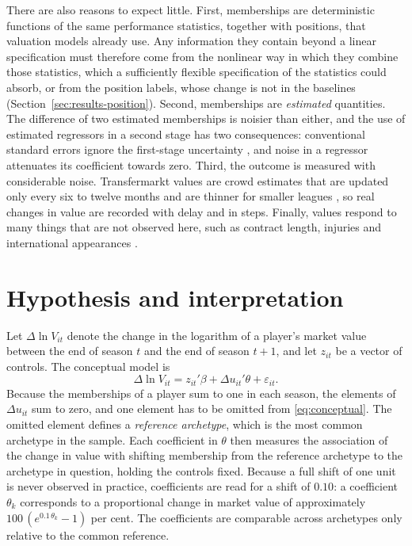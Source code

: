 There are also reasons to expect little. First, memberships are deterministic functions of the same performance statistics, together with positions, that valuation models already use. Any information they contain beyond a linear specification must therefore come from the nonlinear way in which they combine those statistics, which a sufficiently flexible specification of the statistics could absorb, or from the position labels, whose change is not in the baselines (Section~\ref{sec:results-position}). Second, memberships are \emph{estimated} quantities. The difference of two estimated memberships is noisier than either, and the use of estimated regressors in a second stage has two consequences: conventional standard errors ignore the first-stage uncertainty \cite{pagan1984econometric}, and noise in a regressor attenuates its coefficient towards zero. Third, the outcome is measured with considerable noise. Transfermarkt values are crowd estimates that are updated only every six to twelve months and are thinner for smaller leagues \cite{muller2017beyond}, so real changes in value are recorded with delay and in steps. Finally, values respond to many things that are not observed here, such as contract length, injuries and international appearances \cite{franceschi2024determinants,poli2024statistical}.

\section{Hypothesis and interpretation}
\label{sec:theory-hypothesis}

Let $\Delta\ln V_{it}$ denote the change in the logarithm of a player's market value between the end of season $t$ and the end of season $t+1$, and let $z_{it}$ be a vector of controls. The conceptual model is
\begin{equation}
	\Delta\ln V_{it} = z_{it}'\beta + \Delta u_{it}'\theta + \varepsilon_{it}.
	\label{eq:conceptual}
\end{equation}
Because the memberships of a player sum to one in each season, the elements of $\Delta u_{it}$ sum to zero, and one element has to be omitted from \eqref{eq:conceptual}. The omitted element defines a \emph{reference archetype}, which is the most common archetype in the sample. Each coefficient in $\theta$ then measures the association of the change in value with shifting membership from the reference archetype to the archetype in question, holding the controls fixed. Because a full shift of one unit is never observed in practice, coefficients are read for a shift of $0.10$: a coefficient $\theta_k$ corresponds to a proportional change in market value of approximately $100\,(e^{0.1\,\theta_k}-1)$ per cent. The coefficients are comparable across archetypes only relative to the common reference.

